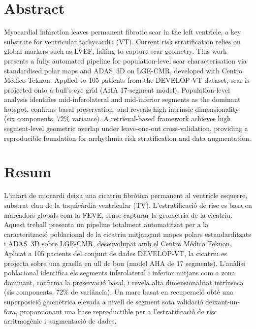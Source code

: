 \cleardoublepage


\section*{\Large \sffamily Abstract}

{\fontsize{11}{13.5}\selectfont
\noindent
Myocardial infarction leaves permanent fibrotic scar in the left ventricle, a key substrate
for ventricular tachycardia (VT). Current risk stratification relies on global markers such as
LVEF, failing to capture scar geometry. This work presents a fully automated pipeline for
population-level scar characterisation via standardised polar maps and ADAS~3D on
LGE-CMR, developed with Centro M\'{e}dico Teknon.
Applied to 105 patients from the DEVELOP-VT dataset, scar is projected onto a bull's-eye
grid (AHA 17-segment model). Population-level analysis identifies mid-inferolateral and
mid-inferior segments as the dominant hotspot, confirms basal preservation, and reveals
high intrinsic dimensionality (six components, 72\% variance). A retrieval-based framework
achieves high segment-level geometric overlap under leave-one-out cross-validation,
providing a reproducible foundation for arrhythmia risk stratification and data augmentation.
}

\section*{\Large \sffamily Resum}

{\fontsize{11}{13.5}\selectfont
\noindent
L'infart de miocardi deixa una cicatriu fibr\`{o}tica permanent al ventr\'{i}cle esquerre, substrat
clau de la taquic\`{a}rdia ventricular (TV). L'estratificaci\'{o} de risc es basa en marcadors globals
com la FEVE, sense capturar la geometria de la cicatriu. Aquest treball presenta un pipeline
totalment automatitzat per a la caracteritzaci\'{o} pob\-la\-cio\-nal de la cicatriu mitjan\c{c}ant
mapes polars estandarditzats i ADAS~3D sobre LGE-CMR, desenvolupat amb el Centro M\'{e}dico Teknon.
Aplicat a 105 pacients del conjunt de dades DEVELOP-VT, la cicatriu es projecta sobre una
graella en ull de bou (model AHA de 17 segments). L'an\`{a}lisi poblacional identifica els
segments inferolateral i inferior mitjans com a zona dominant, confirma la preservaci\'{o} basal,
i revela alta dimensionalitat intr\'{i}nseca (sis components, 72\% de vari\`{a}ncia). Un marc basat
en recuperaci\'{o} obt\'{e} una superposici\'{o} geom\`{e}trica elevada a nivell de segment sota validaci\'{o}
deixant-un-fora, proporcionant una base reproductible per a l'estratificaci\'{o} de risc arritmog\`{e}nic i augmentaci\'{o} de dades.
}

